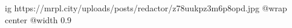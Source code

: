  
 
 
 
 

\ifcmt
  ig https://mrpl.city/uploads/posts/redactor/z78uukpz3m6p8opd.jpg
  @wrap center
  @width 0.9
\fi
